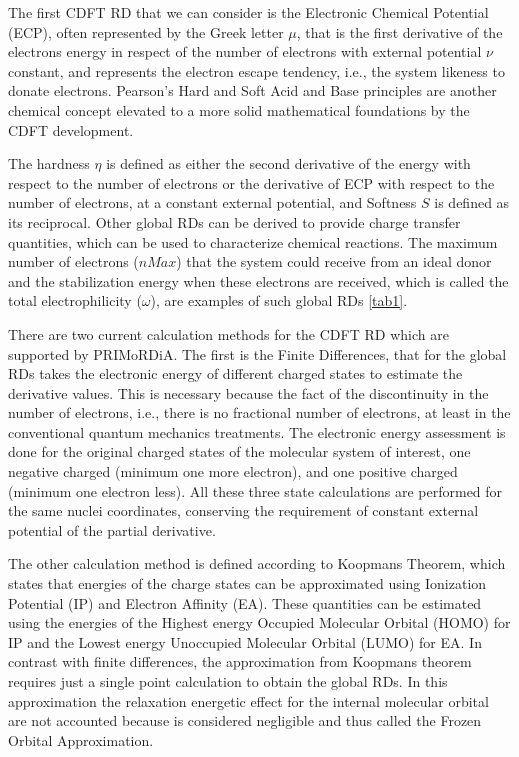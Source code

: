 \documentclass[a4paper,11pt]{refart}
\begin{document}

The first CDFT RD that we can consider is the Electronic Chemical Potential (ECP), often represented by the Greek letter $\mu$, that is the first derivative of the electrons energy in respect of the number of electrons with external potential $\nu$ constant, and represents the electron escape tendency, i.e., the system likeness to donate electrons.
Pearson's Hard and Soft Acid and Base principles are another chemical concept elevated to a more solid mathematical foundations by the CDFT development\cite{pearson1987recent}. 

The hardness $\eta$ is defined as either the second derivative of the energy with respect to the number of electrons or the derivative of ECP with respect to the number of electrons, at a constant external potential, and Softness $S$ is defined as its reciprocal. Other global RDs can be derived to provide charge transfer quantities, which can be used to characterize chemical reactions. The maximum number of electrons ($nMax$) that the system could receive from an ideal donor and the stabilization energy when these electrons are received, which is called the total electrophilicity ($\omega$), are examples of such global RDs \autoref{tab1}.

There are two current calculation methods for the CDFT RD which are supported by PRIMoRDiA. The first is the Finite Differences, that for the global RDs takes the electronic energy of different charged states to estimate the derivative values. This is necessary because the fact of the discontinuity in the number of electrons, i.e., there is no fractional number of electrons, at least in the conventional quantum mechanics treatments. The electronic energy assessment is done for the original charged states of the molecular system of interest, one negative charged (minimum one more electron), and one positive charged (minimum one electron less). All these three state calculations are performed for the same nuclei coordinates, conserving the requirement of constant external potential of the partial derivative. 

The other calculation method is defined according to Koopmans Theorem, which states that energies of the charge states can be approximated using Ionization Potential (IP) and Electron Affinity (EA). These quantities can be estimated using the energies of the Highest energy Occupied Molecular Orbital (HOMO) for IP and the Lowest energy Unoccupied Molecular Orbital (LUMO) for EA. In contrast with finite differences, the approximation from Koopmans theorem requires just a single point calculation to obtain the global RDs. In this approximation the relaxation energetic effect for the internal molecular orbital are not accounted because is considered negligible and thus called the Frozen Orbital Approximation. 
\end{document}
